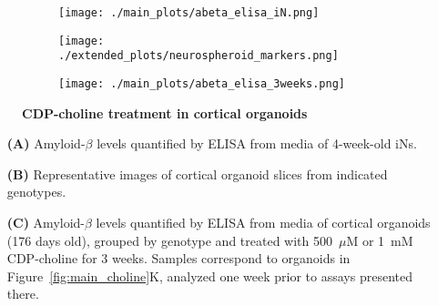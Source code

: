 \begin{figure}[H]
    \begin{subfigure}[t]{0.5\textwidth}
        \caption{}
        \texttt{[image: ./main\_plots/abeta\_elisa\_iN.png]}        
    \end{subfigure}  
    \par
    \begin{subfigure}[t]{0.7\textwidth}
        \caption{}
        \texttt{[image: ./extended\_plots/neurospheroid\_markers.png]}        
    \end{subfigure}
    \par
    \begin{subfigure}[t]{0.7\textwidth}
        \caption{}
        \texttt{[image: ./main\_plots/abeta\_elisa\_3weeks.png]}        
    \end{subfigure}
    \caption{
        \textbf{CDP-choline treatment in cortical organoids}\\
    }
    \label{fig:neurospheroid_figure}
\end{figure}
\begin{itemize}
    \item[\textbf{(A)}] Amyloid-$\beta$ levels quantified by ELISA from media of 4-week-old iNs.
    \item[\textbf{(B)}] Representative images of cortical organoid slices from indicated genotypes.
    \item[\textbf{(C)}] Amyloid-$\beta$ levels quantified by ELISA from media of cortical organoids (176 days old), grouped by genotype and treated with 500~$\mu$M or 1~mM CDP-choline for 3 weeks. Samples correspond to organoids in Figure~\ref{fig:main_choline}K, analyzed one week prior to assays presented there.
\end{itemize}